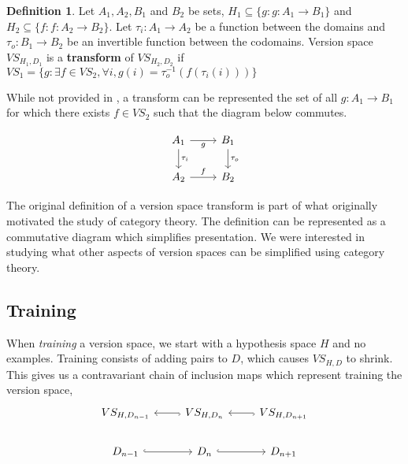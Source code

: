 \documentclass{article}
\theoremstyle{definition}
\newtheorem{definition}{Definition}[section]
\begin{document}
\begin{definition}
Let $A_1, A_2, B_1 $ and $B_2$ be sets, $H_1 \subseteq \{g : g: A_1 \rightarrow B_1\}$ and $H_2 \subseteq \{f: f: A_2 \rightarrow B_2\}$. Let $\tau_i: A_1 \rightarrow A_2$ be a function between the domains and $\tau_o:B_1 \rightarrow B_2$ be an invertible function between the codomains. Version space $VS_{H_1, D_1}$ is a \textbf{transform} of $VS_{H_2, D_2}$ if $VS_1 = \{g : \exists f \in VS_2, \forall i,  g(i) = \tau_o^{-1}(f(\tau_i(i)))\}$

While not provided in \cite{short}, a transform can be represented the set of all $g:A_1 \rightarrow B_1$ for which there exists $f \in VS_2$ such that the diagram below commutes.

\[\begin{tikzcd}
	{A_1} & {B_1} \\
	{A_2} & {B_2}
	\arrow["{\tau_i}", from=1-1, to=2-1]
	\arrow["g"', from=1-1, to=1-2]
	\arrow["{\tau_o}", to=2-2, from=1-2]
	\arrow["f", from=2-1, to=2-2]
\end{tikzcd}\]

The original definition of a version space transform is part of what originally motivated the study of category theory. The definition can be represented as a commutative diagram which simplifies presentation. We were interested in studying what other aspects of version spaces can be simplified using category theory.

\subsection{Training}
When \textit{training} a version space, we start with a hypothesis space $H$ and no examples. Training consists of adding pairs to $D$, which causes $VS_{H,D}$ to shrink. This gives us a contravariant chain of inclusion maps which represent training the version space,
\[\begin{tikzcd}
	{VS_{H,D_{n-1}}} & {VS_{H,D_n}} & {VS_{H,D_{n+1}}} \\
	{D_{n-1}} & {D_n} & {D_{n+1}}
	\arrow[hook, from=1-3, to=1-2]
	\arrow[hook, from=2-2, to=2-3]
	\arrow[hook, from=1-2, to=1-1]
	\arrow[hook, from=2-1, to=2-2]
\end{tikzcd}\]

\end{definition}
\end{document}
